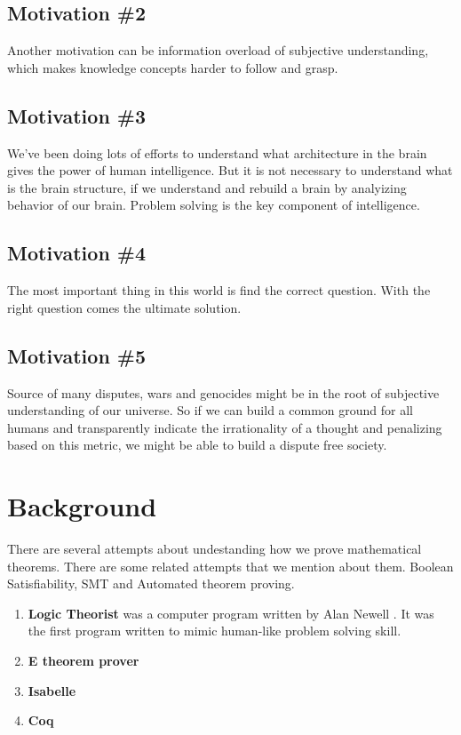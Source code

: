 \documentclass{article}
\begin{document}
\subsection{Motivation \#2} 

Another motivation can be information overload of subjective understanding, which makes knowledge concepts harder to follow and grasp.



\subsection{Motivation \#3} 

We've been doing lots of efforts to understand what architecture in the brain gives the power of human intelligence. But it is not necessary to understand what is the brain structure, if we understand and rebuild a brain by analyizing behavior of our brain. Problem solving is the key component of intelligence. 


\subsection{Motivation \#4} 
The most important thing in this world is find the correct question. With the right question comes the ultimate solution.


\subsection{Motivation \#5} 

Source of many disputes, wars and genocides might be in the root of subjective understanding of our universe. So if we can build a common ground for all humans and transparently indicate the irrationality of a thought and penalizing based on this metric, we might be able to build a dispute free society.



\section{Background}

There are several attempts about undestanding how we prove mathematical theorems. There are some related attempts that we mention about them. Boolean Satisfiability, SMT and Automated theorem proving.

\begin{enumerate}

\item \textbf{Logic Theorist} was a computer program written by Alan Newell . It was the first program written to mimic human-like problem solving skill. 

\item \textbf{E theorem prover}

\item \textbf{Isabelle}


\item \textbf{Coq}

\end{enumerate}
\end{document}
